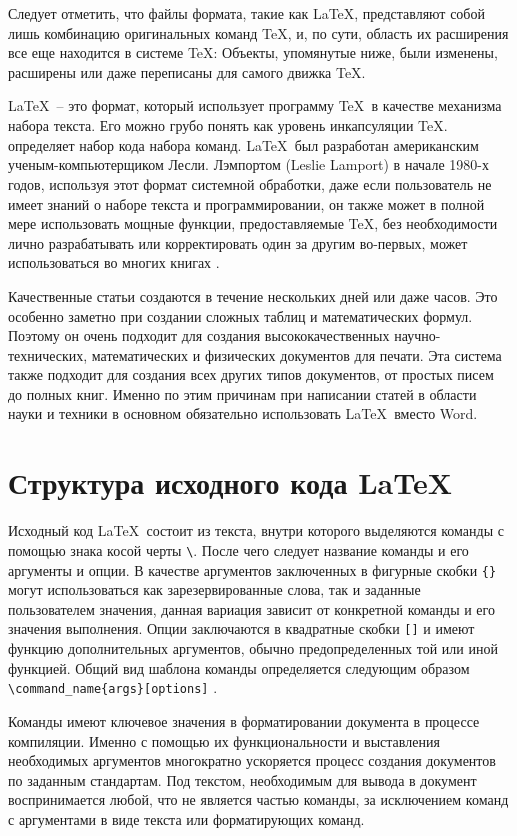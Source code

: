 Следует отметить, что файлы формата, такие как \LaTeX, представляют собой лишь комбинацию оригинальных команд \TeX, и, по сути, область их расширения все еще находится в системе \TeX: Объекты, упомянутые ниже, были изменены, расширены или даже переписаны для самого движка \TeX.

\LaTeX \verb| |-- это формат, который использует программу \TeX \verb| |в качестве механизма набора текста. Его можно грубо понять как уровень инкапсуляции \TeX. \guillemotright \verb| |определяет набор кода набора команд. \LaTeX \verb| |был разработан американским ученым-компьютерщиком Лесли. Лэмпортом (Leslie Lamport) в начале 1980-х годов, используя этот формат системной обработки, даже если пользователь не имеет знаний о наборе текста и программировании, он также может в полной мере использовать мощные функции, предоставляемые \TeX, без необходимости лично разрабатывать или корректировать один за другим во-первых, может использоваться во многих книгах \cite{22}.

Качественные статьи создаются в течение нескольких дней или даже часов. Это особенно заметно при создании сложных таблиц и математических формул.  Поэтому он очень подходит для создания высококачественных научно-технических, математических и физических документов для печати. Эта система также подходит для создания всех других типов документов, от простых писем до полных книг. Именно по этим причинам при написании статей в области науки и техники в основном обязательно использовать \LaTeX \verb| |вместо Word.

\section{Структура исходного кода \LaTeX}

Исходный код \LaTeX\verb| |состоит из текста, внутри которого выделяются команды с помощью знака косой черты \verb|\|. После чего следует название команды и его аргументы и опции. В качестве аргументов заключенных в фигурные скобки \verb|{}| могут использоваться как зарезервированные слова, так и заданные пользователем значения, данная вариация зависит от конкретной команды и его значения выполнения. Опции заключаются в квадратные скобки \verb|[]| и имеют функцию дополнительных аргументов, обычно предопределенных той или иной функцией. Общий вид шаблона команды определяется следующим образом \verb|\command_name{args}[options]| \cite{24}. 

Команды имеют ключевое значения в форматировании документа в процессе компиляции. Именно с помощью их функциональности и выставления необходимых аргументов многократно ускоряется процесс создания документов по заданным стандартам. Под текстом, необходимым для вывода в документ воспринимается любой, что не является частью команды, за исключением команд с аргументами в виде текста или форматирующих команд. 


